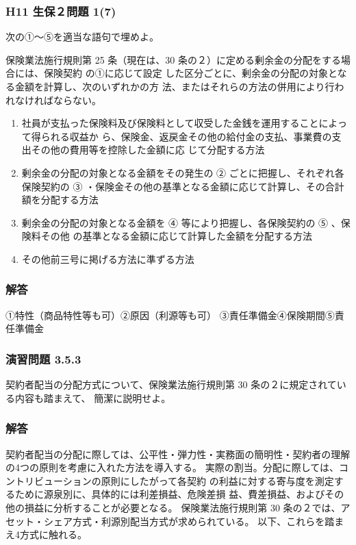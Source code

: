 \documentclass[report,gutter=10mm,fore-edge=10mm,uplatex,dvipdfmx]{jlreq}
\begin{document}
\subsubsection{H11 生保２問題 1(7)}
次の①～⑤を適当な語句で埋めよ。

保険業法施行規則第 25 条（現在は、30 条の２）に定める剰余金の分配をする場合には、保険契約
の①に応じて設定 した区分ごとに、剰余金の分配の対象となる金額を計算し、次のいずれかの方
法、またはそれらの方法の併用により行われなければならない。

\begin{enumerate} [1]
 \item 
 社員が支払った保険料及び保険料として収受した金銭を運用することによって得られる収益か
 ら、保険金、返戻金その他の給付金の支払、事業費の支出その他の費用等を控除した金額に応
 じて分配する方法
 \item 
 剰余金の分配の対象となる金額をその発生の ② ごとに把握し、それぞれ各保険契約の
 ③ ・保険金その他の基準となる金額に応じて計算し、その合計額を分配する方法
 \item 
 剰余金の分配の対象となる金額を ④ 等により把握し、各保険契約の
 ⑤ 、保険料その他 の基準となる金額に応じて計算した金額を分配する方法
 \item 
 その他前三号に掲げる方法に準ずる方法
\end{enumerate}

\subsubsection{解答}
①特性（商品特性等も可）②原因（利源等も可）
③責任準備金④保険期間⑤責任準備金

\subsubsection{ 演習問題 3.5.3}
 契約者配当の分配方式について、保険業法施行規則第 30 条の２に規定されている内容も踏まえて、
 簡潔に説明せよ。

\subsubsection{解答}

契約者配当の分配に際しては、公平性・弾力性・実務面の簡明性・契約者の理解の4つの原則を考慮に入れた方法を導入する。
実際の割当。分配に際しては、コントリビューションの原則にしたがって各契約
の利益に対する寄与度を測定するために源泉別に、具体的には利差損益、危険差損
益、費差損益、およびその他の損益に分析することが必要となる。
保険業法施行規則第 30 条の２では、アセット・シェア方式・利源別配当方式が求められている。
以下、これらを踏まえ4方式に触れる。
\end{document}
